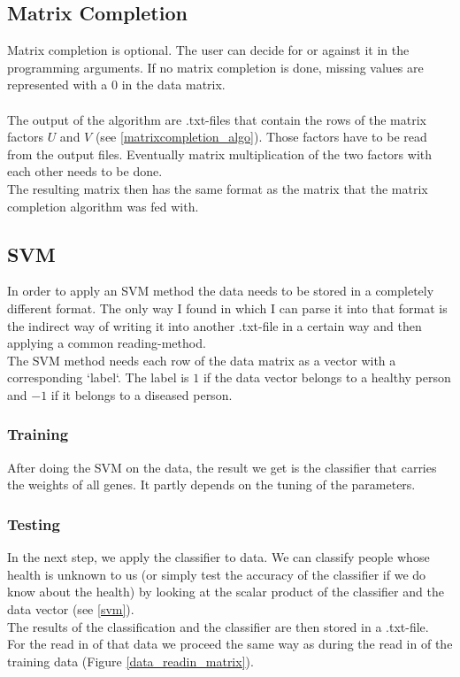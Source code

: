\documentclass{bioinfo}
\begin{document}
\subsection{Matrix Completion}
Matrix completion is optional. The user can decide for or against it in the programming arguments. If no matrix completion is done, missing values are represented with a $0$ in the data matrix.\\\\
The output of the algorithm are .txt-files that contain the rows of the matrix factors $U$ and $V$ (see \ref{matrixcompletion_algo}). Those factors have to be read from the output files. Eventually matrix multiplication of the two factors with each other needs to be done.\\
The resulting matrix then has the same format as the matrix that the matrix completion algorithm was fed with.


\subsection{SVM}
In order to apply an SVM method the data needs to be stored in a completely different format. The only way I found in which I can parse it into that format is the indirect way of writing it into another .txt-file in a certain way and then applying a common reading-method.\\
The SVM method needs each row of the data matrix as a vector with a corresponding `label`. The label is $1$ if the data vector belongs to a healthy person and $-1$ if it belongs to a diseased person.\\
\subsubsection{Training}
After doing the SVM on the data, the result we get is the classifier that carries the weights of all genes. It partly depends on the tuning of the parameters.
\subsubsection{Testing}
In the next step, we apply the classifier to data. We can classify people whose health is unknown to us (or simply test the accuracy of the classifier if we do know about the health) by looking at the scalar product of the classifier and the data vector (see \ref{svm}).\\
The results of the classification and the classifier are then stored in a .txt-file.\\
For the read in of that data we proceed the same way as during the read in of the training data (Figure \ref{data_readin_matrix}).\\
\end{document}
